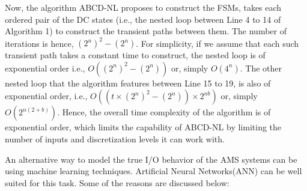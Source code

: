 \documentclass[a4paper]{article}
\begin{document}
Now, the algorithm ABCD-NL proposes to construct the FSMs, takes each ordered pair of the DC states (i.e., the nested loop between Line 4 to 14 of Algorithm 1) to construct the transient paths between them. The number of iterations is hence, $ (2^n)^2 - (2^n) $. For simplicity, if we assume that each such transient path takes a constant time to construct, the nested loop is of exponential order i.e., $O((2^n)^2 - (2^n))$ or, simply $O(4^n)$. The other nested loop that the algorithm features between Line 15 to 19, is also of exponential order, i.e., $O( (t \times (2^n)^2 - (2^n)) \times 2^{nb})$ or, simply $O(2^{n(2+b)})$. Hence, the overall time complexity of the algorithm is of exponential order, which limits the capability of ABCD-NL by limiting the number of inputs and discretization levels it can work with.



An alternative way to model the true I/O behavior of the AMS systems can be using machine learning techniques. Artificial Neural Networks(ANN) can be well suited for this task. Some of the reasons are discussed below: 
\end{document}
